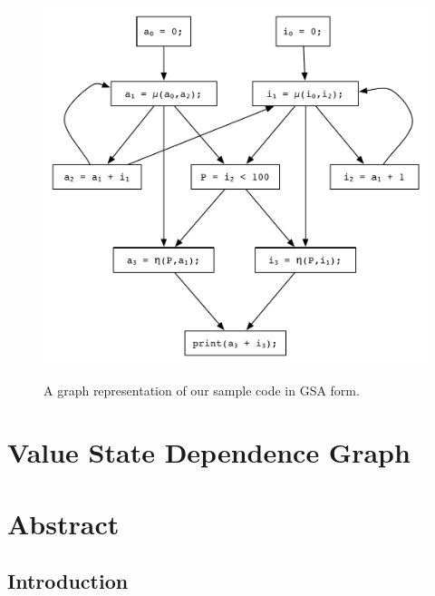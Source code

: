 \begin{figure}
\centering
\includegraphics[scale=0.55]{gsa-example.pdf}
\label{fig: gsa-graph-example}
\caption{A graph representation of our sample code in GSA form.}
\end{figure}


\section{Value State Dependence Graph}



\section*{Abstract}

\subsection*{Introduction}

